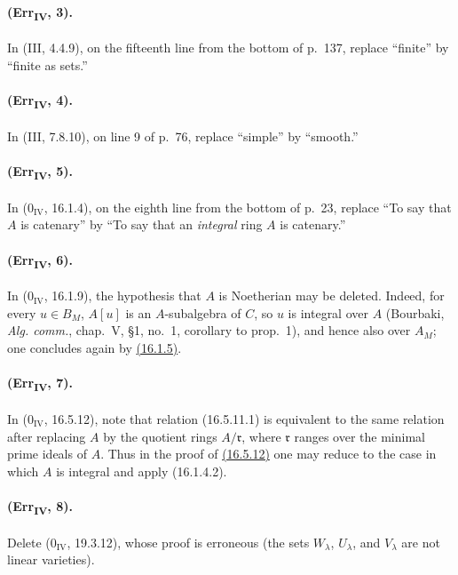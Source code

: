 \paragraph{(Err\textsubscript{IV}, 3).}
In (III, 4.4.9), on the fifteenth line from the bottom of p.~137,
replace ``finite'' by ``finite as sets.''

\paragraph{(Err\textsubscript{IV}, 4).}
In (III, 7.8.10), on line 9 of p.~76, replace ``simple'' by ``smooth.''

\paragraph{(Err\textsubscript{IV}, 5).}
In ($0_{\mathrm{IV}}$, 16.1.4), on the eighth line from the bottom of
p.~23, replace ``To say that $A$ is catenary'' by ``To say that an
\emph{integral} ring $A$ is catenary.''

\paragraph{(Err\textsubscript{IV}, 6).}
In ($0_{\mathrm{IV}}$, 16.1.9), the hypothesis that $A$ is Noetherian
may be deleted.  Indeed, for every $u\in B_M$, $A[u]$ is an
$A$-subalgebra of $C$, so $u$ is integral over $A$ (Bourbaki,
\emph{Alg. comm.}, chap.~V, \S1, no.~1, corollary to prop.~1), and
hence also over $A_M$; one concludes again by {\hyperref[section:IV.16]{(16.1.5)}}.

\paragraph{(Err\textsubscript{IV}, 7).}
In ($0_{\mathrm{IV}}$, 16.5.12), note that relation (16.5.11.1) is
equivalent to the same relation after replacing $A$ by the quotient rings
$A/\mathfrak r$, where $\mathfrak r$ ranges over the minimal prime ideals
of $A$.  Thus in the proof of {\hyperref[section:IV.16]{(16.5.12)}} one may reduce to the case in
which $A$ is integral and apply (16.1.4.2).

\paragraph{(Err\textsubscript{IV}, 8).}
Delete ($0_{\mathrm{IV}}$, 19.3.12), whose proof is erroneous (the sets
$W_\lambda$, $U_\lambda$, and $V_\lambda$ are not linear varieties).

